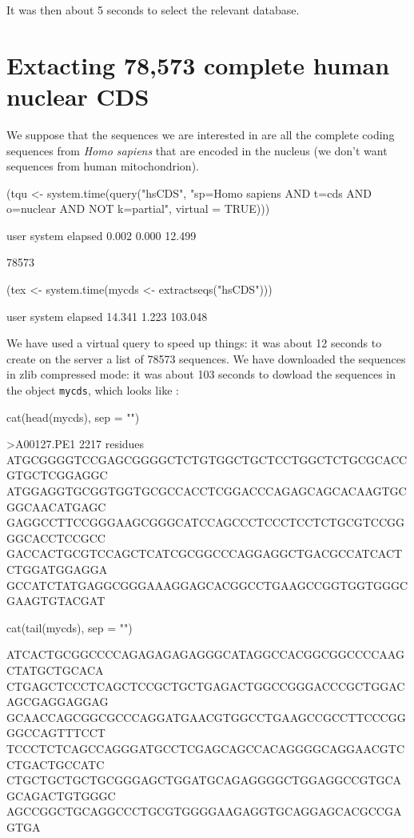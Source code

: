 \documentclass{article}
\begin{document}
It was then about 5 
seconds to select the relevant database.

\section{Extacting 78,573 complete human nuclear CDS}

We suppose that the sequences we are interested in 
are all the complete coding sequences from \textit{Homo sapiens} that
are encoded in the nucleus (we don't want sequences from human mitochondrion). 

\begin{Schunk}
\begin{Sinput}
 (tqu <- system.time(query("hsCDS", "sp=Homo sapiens AND t=cds AND o=nuclear AND NOT k=partial", 
     virtual = TRUE)))
\end{Sinput}
\begin{Soutput}
   user  system elapsed 
  0.002   0.000  12.499 
\end{Soutput}
\begin{Soutput}
[1] 78573
\end{Soutput}
\begin{Sinput}
 (tex <- system.time(mycds <- extractseqs("hsCDS")))
\end{Sinput}
\begin{Soutput}
   user  system elapsed 
 14.341   1.223 103.048 
\end{Soutput}
\end{Schunk}
 
We have used a virtual query to speed up things:
it was about 12 seconds 
to create on the server a list of 78573
sequences. We have downloaded the sequences in zlib compressed mode:
it was about 103 seconds
to dowload the sequences in the object \texttt{mycds}, which looks like :

\begin{Schunk}
\begin{Sinput}
 cat(head(mycds), sep = "\n")
\end{Sinput}
\begin{Soutput}
>A00127.PE1             2217 residues
ATGCGGGGTCCGAGCGGGGCTCTGTGGCTGCTCCTGGCTCTGCGCACCGTGCTCGGAGGC
ATGGAGGTGCGGTGGTGCGCCACCTCGGACCCAGAGCAGCACAAGTGCGGCAACATGAGC
GAGGCCTTCCGGGAAGCGGGCATCCAGCCCTCCCTCCTCTGCGTCCGGGGCACCTCCGCC
GACCACTGCGTCCAGCTCATCGCGGCCCAGGAGGCTGACGCCATCACTCTGGATGGAGGA
GCCATCTATGAGGCGGGAAAGGAGCACGGCCTGAAGCCGGTGGTGGGCGAAGTGTACGAT
\end{Soutput}
\begin{Sinput}
 cat(tail(mycds), sep = "\n")
\end{Sinput}
\begin{Soutput}
ATCACTGCGGCCCCAGAGAGAGAGGGCATAGGCCACGGCGGCCCCAAGCTATGCTGCACA
CTGAGCTCCCTCAGCTCCGCTGCTGAGACTGGCCGGGACCCGCTGGACAGCGAGGAGGAG
GCAACCAGCGGCGCCCAGGATGAACGTGGCCTGAAGCCGCCTTCCCGGGGCCAGTTTCCT
TCCCTCTCAGCCAGGGATGCCTCGAGCAGCCACAGGGGCAGGAACGTCCTGACTGCCATC
CTGCTGCTGCTGCGGGAGCTGGATGCAGAGGGGCTGGAGGCCGTGCAGCAGACTGTGGGC
AGCCGGCTGCAGGCCCTGCGTGGGGAAGAGGTGCAGGAGCACGCCGAGTGA
\end{Soutput}
\end{Schunk}
\end{document}
